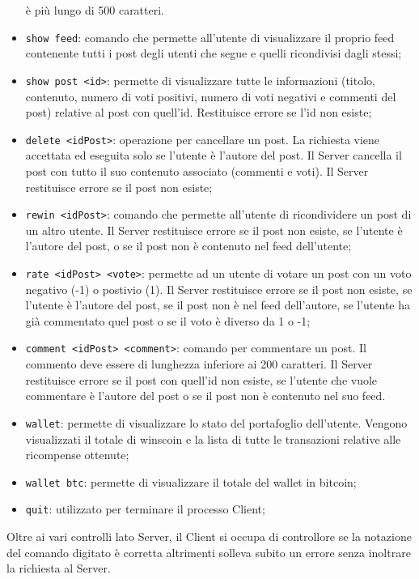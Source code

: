 \documentclass[11pt, a4paper, oneside]{article}
\begin{document}
\begin{itemize}
    è più lungo di 500 caratteri.
    \item \texttt{show feed}: comando che permette all'utente di visualizzare il proprio feed contenente tutti i post degli utenti che segue e quelli ricondivisi dagli stessi;
    \item \texttt{show post <id>}: permette di visualizzare tutte le informazioni (titolo, contenuto, numero di voti positivi, numero di voti negativi e
    commenti del post) relative al post con quell'id. Restituisce errore se l'id non esiste;
    \item \texttt{delete <idPost>}: operazione per cancellare un post. La richiesta viene accettata ed eseguita solo se l’utente è l’autore del post. Il Server cancella 
    il post con tutto il suo contenuto associato (commenti e voti). Il Server restituisce errore se il post non esiste;
    \item \texttt{rewin <idPost>}: comando che permette all'utente di ricondividere un post di un altro utente. Il Server restituisce errore se il post non esiste, se l'utente è
    l'autore del post, o se il post non è contenuto nel feed dell'utente;
    \item \texttt{rate <idPost> <vote>}: permette ad un utente di votare un post con un voto negativo (-1) o postivio (1). Il Server restituisce errore se il post non esiste, 
    se l'utente è l'autore del post, se il post non è nel feed dell'autore, se l'utente ha già commentato quel post o se il voto è diverso da 1 o -1;
    \item \texttt{comment <idPost> <comment>}: comando per commentare un post. Il commento deve essere di lunghezza inferiore ai 200 caratteri. 
    Il Server restituisce errore se il post con quell'id non esiste, se l'utente che vuole commentare
    è l'autore del post o se il post non è contenuto nel suo feed.
    \item \texttt{wallet}: permette di visualizzare lo stato del portafoglio dell'utente. Vengono visualizzati il totale di winscoin e la lista di tutte le transazioni
    relative alle ricompense ottenute;
    \item \texttt{wallet btc}: permette di visualizzare il totale del wallet in bitcoin;
    \item \texttt{quit}: utilizzato per terminare il processo Client;
\end{itemize}  
Oltre ai vari controlli lato Server, il Client si occupa di controllore se la notazione del comando digitato è corretta altrimenti solleva subito un errore senza
inoltrare la richiesta al Server.
\end{document}
